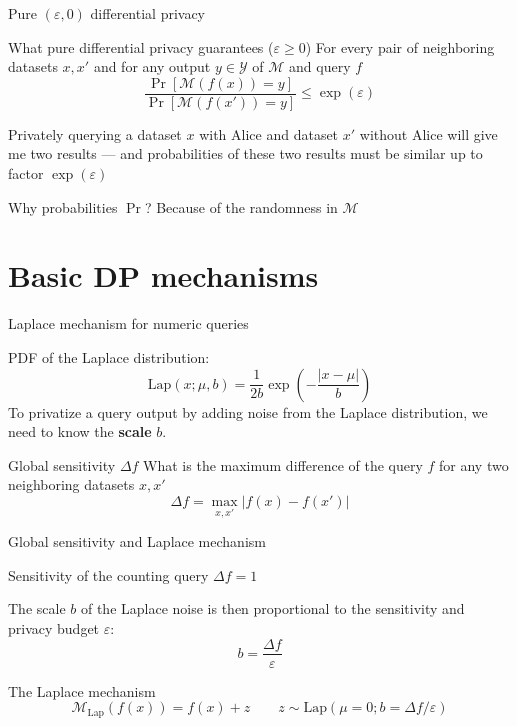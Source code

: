 \documentclass[12pt,aspectratio=169,handout]{beamer}
\begin{document}
\begin{frame}{Pure $(\varepsilon, 0)$ differential privacy}
	
\begin{block}{What pure differential privacy guarantees ($\varepsilon \geq 0$)}
	For every pair of neighboring datasets $x, x'$ and for any output $y \in \mathcal{Y}$ of $\mathcal{M}$ and query $f$
	$$
	\frac{
		\Pr \left[ \mathcal{M}(f(x)) = y  \right]
	}{
		\Pr \left[ \mathcal{M}(f(x')) = y  \right]
	}
	\leq \exp(\varepsilon)
	$$
\end{block}

Privately querying a dataset $x$ with Alice and dataset $x'$ without Alice will give me two results --- and probabilities of these two results must be similar up to factor $\exp(\varepsilon)$

Why probabilities $\Pr$? Because of the randomness in $\mathcal{M}$	
\end{frame}

\section{Basic DP mechanisms}

\begin{frame}{Laplace mechanism for numeric queries}

PDF of the Laplace distribution:
$$
\mathrm{Lap}(x; \mu, b) = \frac{1}{2b} \exp \left( - \frac{| x - \mu |}{b} \right)
$$
To privatize a query output by adding noise from the Laplace distribution, we need to know the \textbf{scale} $b$.

\begin{block}{Global sensitivity $\Delta f$}
What is the maximum difference of the query $f$ for any two neighboring datasets $x, x'$
$$
\Delta f = \max_{x, x'} | f(x) - f(x')|
$$
\end{block}
	
\end{frame}

\begin{frame}{Global sensitivity and Laplace mechanism}

\begin{example}
Sensitivity of the counting query $\Delta f = 1$
\end{example}

The scale $b$ of the Laplace noise is then proportional to the sensitivity and privacy budget $\varepsilon$:
$$
b = \frac{\Delta f}{\varepsilon}
$$


\begin{block}{The Laplace mechanism}
$$
\mathcal{M_{\mathrm{Lap}}}(f(x)) = f(x) + z \qquad
z \sim \textrm{Lap}(\mu = 0; b = \Delta f / \varepsilon)
$$
\end{block}

\end{frame}
\end{document}
